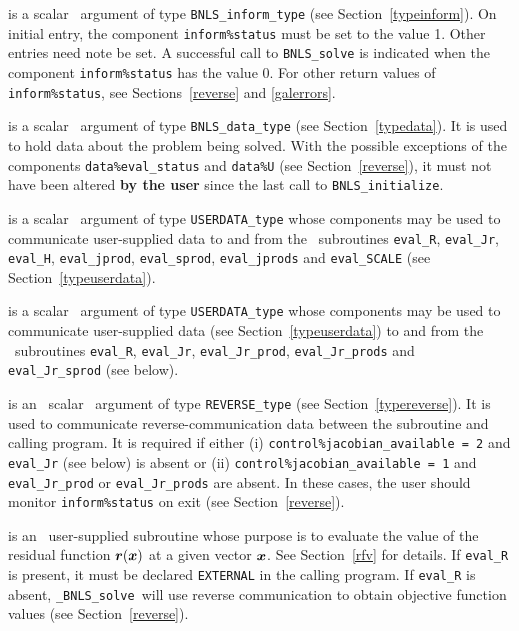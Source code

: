 \documentclass{galahad}
\newcommand{\packagename}{BNLS}
\newcommand{\fullpackagename}{\libraryname\_\packagename}
\newcommand{\solver}{{\tt \fullpackagename\_solve}}
\begin{document}
\begin{description}
 is a scalar \intentinout\ argument of type
{\tt \packagename\_inform\_type}
(see Section~\ref{typeinform}).
On initial entry, the  component {\tt inform\%status} must be set to the
value 1. Other entries need note be set.
A successful call to
{\tt \packagename\_solve}
is indicated when the  component {\tt inform\%status} has the value 0.
For other return values of {\tt inform\%status}, see
Sections~\ref{reverse} and \ref{galerrors}.

 is a scalar \intentinout\ argument of type
{\tt \packagename\_data\_type}
(see Section~\ref{typedata}). It is used to hold data about the problem being
solved. With the possible exceptions of the components
{\tt data\%eval\_status} and {\tt data\%U} (see Section~\ref{reverse}),
it must not have been altered {\bf by the user} since the last call to
{\tt \packagename\_initialize}.

 is a scalar \intentinout\ argument of type
{\tt USERDATA\_type} whose components may be used
to communicate user-supplied data to and from the \optional\ subroutines
{\tt eval\_R}, {\tt eval\_Jr}, {\tt eval\_H}, {\tt eval\_jprod},
{\tt eval\_sprod}, {\tt eval\_jprods} and {\tt eval\_SCALE}
(see Section~\ref{typeuserdata}).

 is a scalar \intentinout\ argument of type
{\tt USERDATA\_type} whose components may be used
to communicate user-supplied data (see Section~\ref{typeuserdata})
to and from the \optional\ subroutines
 {\tt eval\_R}, {\tt eval\_Jr},
 {\tt eval\_Jr\_prod}, {\tt eval\_Jr\_prods} and {\tt eval\_Jr\_sprod} 
(see below).

 is an \optional\ scalar \intentinout\ argument of type
{\tt REVERSE\_type}
(see Section~\ref{typereverse}).
It is used to communicate reverse-communication data between the
subroutine and calling program. It is required if either 
(i) {\tt control\%jacobian\_available = 2} and {\tt eval\_Jr} 
(see below) is absent or 
(ii) {\tt control\%jacobian\_available = 1} and 
{\tt eval\_Jr\_prod} or {\tt eval\_Jr\_prods} are absent.
In these cases, the user should monitor {\tt inform\%status} on exit
(see Section~\ref{reverse}).

 is an \optional\
user-supplied subroutine whose purpose is to evaluate the value of the
residual function ${\bm{r}}({\bm{x}})$ at a given vector ${\bm{x}}$.
See Section~\ref{rfv} for details.
If {\tt eval\_R} is present,
it must be declared {\tt EXTERNAL} in the calling program.
If {\tt eval\_R} is absent, \solver\ will use reverse communication to
obtain objective function values (see Section~\ref{reverse}).


\end{description}
\end{document}
